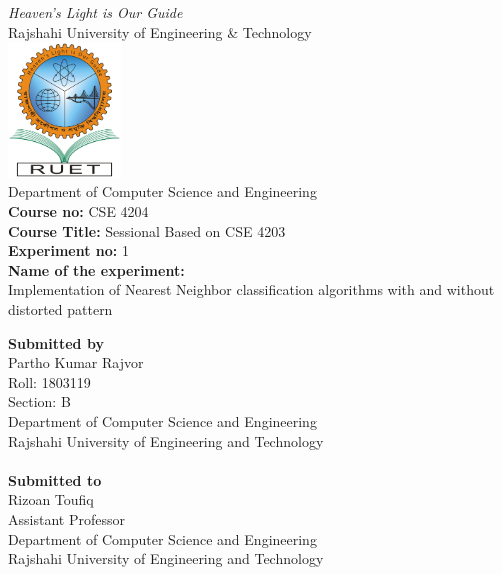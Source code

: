 \begin{center}
    \textit{Heaven’s Light is Our Guide} \\
    \vspace{1cm}
    \Large{Rajshahi University of Engineering \& Technology} \\
    \vspace{1cm}
    \includegraphics[width=3cm]{ruet-logo.png}\\
    \vspace{0.1cm}
    \Large{Department of Computer Science and Engineering} \\
    \vspace{1cm}
    \large{\textbf{Course no:} CSE 4204} \\
    \large{\textbf{Course Title:} Sessional Based on CSE 4203} \\
    \large{\textbf{Experiment no:} 1}\\
    \large{\textbf{Name of the experiment:}} \\
    \large{Implementation of Nearest Neighbor classification algorithms with and without distorted pattern} \\
    \vspace{1cm}
\end{center}
\Large{\textbf{Submitted by}}\\
Partho Kumar Rajvor \\
Roll: 1803119 \\
Section: B \\
Department of Computer Science and Engineering\\
Rajshahi University of Engineering and Technology\\\\
\Large{\textbf{Submitted to}}\\
Rizoan Toufiq \\
Assistant Professor \\
Department of Computer Science and Engineering \\
Rajshahi University of Engineering and Technology \\
\thispagestyle{empty}

\tableofcontents{}
\thispagestyle{empty}

